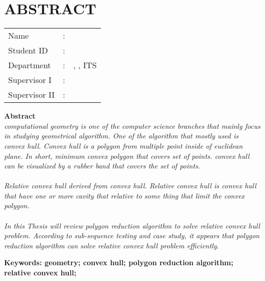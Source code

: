\chapter {ABSTRACT}
\noindent\textbf{\MakeUppercase\juduleng}
\vspace*{1em}

\begin{tabularx}{\linewidth}{ l l p{2.2in} }
	Name 			& : & \penulis \\
	Student ID		& :	& \nrp \\
	Department 		& : & \jurusaneng, \newline \fakultaseng, ITS \\
	Supervisor I 	& : & \pembimbingsatu \\
	Supervisor II 	& : & \pembimbingdua
	\vspace*{1em} 	%
\end {tabularx}
	
\noindent\textbf{Abstract} \\
\itshape
computational geometry is one of the computer science branches that mainly focus in studying geometrical algorithm. One of the algorithm that mostly used is convex hull. Convex hull is a polygon from multiple point inside of euclidean plane. In short, minimum convex polygon that covers set of points. convex hull can be visualized by a rubber band that covers the set of points.\\\\
Relative convex hull derived from convex hull. Relative convex hull is convex hull that have one or more cavity that relative to some thing that limit the convex polygon.\\\\
In this Thesis will review polygon reduction algorithm to solve relative convex hull problem. According to sub-sequence testing and case study, it appears that polygon reduction algorithm can solve relative convex hull problem efficiently.

\vspace*{1em}
\noindent\bfseries Keywords: geometry; convex hull; polygon reduction algorithm; relative convex hull;
\normalfont
\cleardoublepage